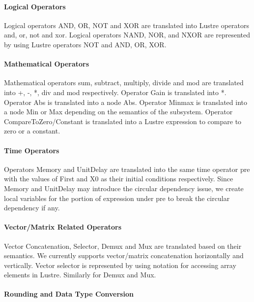 \documentclass{article}
\begin{document}
\paragraph{Logical Operators} 
Logical operators \textsf{AND, OR, NOT} and \textsf{XOR} are translated into Lustre operators 
\textsf{and, or, not} and \textsf{xor}.
Logical operators \textsf{NAND, NOR}, and \textsf{NXOR} are represented by using Lustre 
operators \textsf{NOT} and \textsf{AND, OR, XOR}.

\paragraph{Mathematical Operators} 
Mathematical operators sum, subtract, multiply, divide and mod are translated into 
\textsf{+}, \textsf{-}, \textsf{*}, \textsf{div} and \textsf{mod} respectively.
Operator Gain is translated into \textsf{*}. 
Operator Abs is translated into a node Abs. 
Operator Minmax is translated into a node Min or Max depending on the semantics of the subsystem. 
Operator CompareToZero/Constant is translated into a Lustre expression to compare to zero or a constant. 

\paragraph{Time Operators}
Operators Memory and UnitDelay are translated into the same time operator \textsf{pre} with the 
values of First and X0 as their initial conditions respectively.
Since Memory and UnitDelay may introduce the circular dependency issue, we create local variables for the portion of expression under \textsf{pre} to break the circular dependency if any. 

\paragraph{Vector/Matrix Related Operators}
Vector Concatenation, Selector, Demux and Mux are translated based on their semantics. 
We currently supports vector/matrix concatenation horizontally and vertically. 
Vector selector is represented by using notation for accessing array elements in Lustre.
Similarly for Demux and Mux. 

\paragraph{Rounding and Data Type Conversion}
\end{document}
